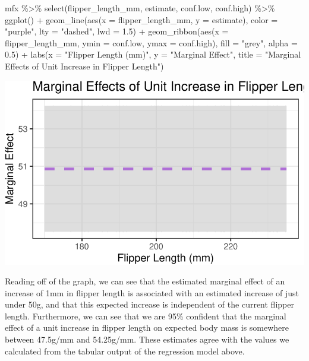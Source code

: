 \documentclass[
  letterpaper,
  DIV=11,
  numbers=noendperiod]{scrartcl}
\newenvironment{Shaded}{\begin{snugshade}}{\end{snugshade}}
\newcommand{\AttributeTok}[1]{\textcolor[rgb]{0.40,0.45,0.13}{#1}}
\newcommand{\FloatTok}[1]{\textcolor[rgb]{0.68,0.00,0.00}{#1}}
\newcommand{\FunctionTok}[1]{\textcolor[rgb]{0.28,0.35,0.67}{#1}}
\newcommand{\NormalTok}[1]{\textcolor[rgb]{0.00,0.23,0.31}{#1}}
\newcommand{\SpecialCharTok}[1]{\textcolor[rgb]{0.37,0.37,0.37}{#1}}
\newcommand{\StringTok}[1]{\textcolor[rgb]{0.13,0.47,0.30}{#1}}
\begin{document}
\begin{Shaded}
\begin{Highlighting}[]
\NormalTok{mfx }\SpecialCharTok{\%\textgreater{}\%}
  \FunctionTok{select}\NormalTok{(flipper\_length\_mm, estimate, conf.low, conf.high) }\SpecialCharTok{\%\textgreater{}\%} 
  \FunctionTok{ggplot}\NormalTok{() }\SpecialCharTok{+}
  \FunctionTok{geom\_line}\NormalTok{(}\FunctionTok{aes}\NormalTok{(}\AttributeTok{x =}\NormalTok{ flipper\_length\_mm, }\AttributeTok{y =}\NormalTok{ estimate), }\AttributeTok{color =} \StringTok{"purple"}\NormalTok{, }\AttributeTok{lty =} \StringTok{"dashed"}\NormalTok{, }\AttributeTok{lwd =} \FloatTok{1.5}\NormalTok{) }\SpecialCharTok{+}
  \FunctionTok{geom\_ribbon}\NormalTok{(}\FunctionTok{aes}\NormalTok{(}\AttributeTok{x =}\NormalTok{ flipper\_length\_mm, }\AttributeTok{ymin =}\NormalTok{ conf.low, }\AttributeTok{ymax =}\NormalTok{ conf.high),}
              \AttributeTok{fill =} \StringTok{"grey"}\NormalTok{, }\AttributeTok{alpha =} \FloatTok{0.5}\NormalTok{) }\SpecialCharTok{+}
  \FunctionTok{labs}\NormalTok{(}\AttributeTok{x =} \StringTok{"Flipper Length (mm)"}\NormalTok{,}
       \AttributeTok{y =} \StringTok{"Marginal Effect"}\NormalTok{,}
       \AttributeTok{title =} \StringTok{"Marginal Effects of Unit Increase in Flipper Length"}\NormalTok{)}
\end{Highlighting}
\end{Shaded}

\includegraphics{10d_MultipleLinearRegression_files/figure-pdf/unnamed-chunk-10-1.pdf}

Reading off of the graph, we can see that the estimated marginal effect
of an increase of 1mm in flipper length is associated with an estimated
increase of just under 50g, and that this expected increase is
independent of the current flipper length. Furthermore, we can see that
we are 95\% confident that the marginal effect of a unit increase in
flipper length on expected body mass is somewhere between 47.5g/mm and
54.25g/mm. These estimates agree with the values we calculated from the
tabular output of the regression model above.
\end{document}
